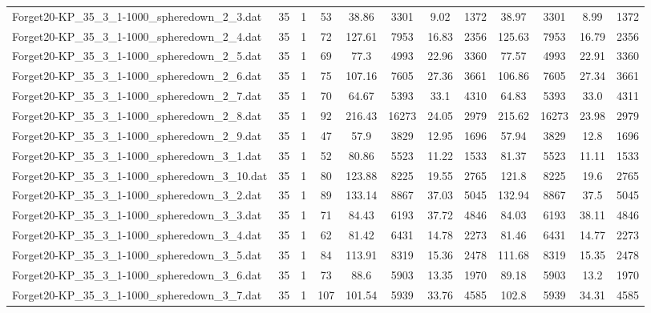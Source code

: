 \begin{sidewaystable}[!ht]
{\begin{tabular}{lccccccccccc}
Forget20-KP\_35\_3\_1-1000\_spheredown\_2\_3.dat & 35 & 1 & 53 & 38.86 & 3301 & 9.02 & 1372 & 38.97 & 3301 &  \textcolor{blue2}{8.99} & 1372 \\
Forget20-KP\_35\_3\_1-1000\_spheredown\_2\_4.dat & 35 & 1 & 72 & 127.61 & 7953 & 16.83 & 2356 & 125.63 & 7953 &  \textcolor{blue2}{16.79} & 2356 \\
Forget20-KP\_35\_3\_1-1000\_spheredown\_2\_5.dat & 35 & 1 & 69 & 77.3 & 4993 & 22.96 & 3360 & 77.57 & 4993 &  \textcolor{blue2}{22.91} & 3360 \\
Forget20-KP\_35\_3\_1-1000\_spheredown\_2\_6.dat & 35 & 1 & 75 & 107.16 & 7605 & 27.36 & 3661 & 106.86 & 7605 & 27.34 & 3661 \\
Forget20-KP\_35\_3\_1-1000\_spheredown\_2\_7.dat & 35 & 1 & 70 & 64.67 & 5393 & 33.1 & 4310 & 64.83 & 5393 &  \textcolor{blue2}{33.0} & 4311 \\
Forget20-KP\_35\_3\_1-1000\_spheredown\_2\_8.dat & 35 & 1 & 92 & 216.43 & 16273 & 24.05 & 2979 & 215.62 & 16273 &  \textcolor{blue2}{23.98} & 2979 \\
Forget20-KP\_35\_3\_1-1000\_spheredown\_2\_9.dat & 35 & 1 & 47 & 57.9 & 3829 & 12.95 & 1696 & 57.94 & 3829 &  \textcolor{blue2}{12.8} & 1696 \\
Forget20-KP\_35\_3\_1-1000\_spheredown\_3\_1.dat & 35 & 1 & 52 & 80.86 & 5523 & 11.22 & 1533 & 81.37 & 5523 &  \textcolor{blue2}{11.11} & 1533 \\
Forget20-KP\_35\_3\_1-1000\_spheredown\_3\_10.dat & 35 & 1 & 80 & 123.88 & 8225 &  \textcolor{blue2}{19.55} & 2765 & 121.8 & 8225 & 19.6 & 2765 \\
Forget20-KP\_35\_3\_1-1000\_spheredown\_3\_2.dat & 35 & 1 & 89 & 133.14 & 8867 &  \textcolor{blue2}{37.03} & 5045 & 132.94 & 8867 & 37.5 & 5045 \\
Forget20-KP\_35\_3\_1-1000\_spheredown\_3\_3.dat & 35 & 1 & 71 & 84.43 & 6193 &  \textcolor{blue2}{37.72} & 4846 & 84.03 & 6193 & 38.11 & 4846 \\
Forget20-KP\_35\_3\_1-1000\_spheredown\_3\_4.dat & 35 & 1 & 62 & 81.42 & 6431 & 14.78 & 2273 & 81.46 & 6431 &  \textcolor{blue2}{14.77} & 2273 \\
Forget20-KP\_35\_3\_1-1000\_spheredown\_3\_5.dat & 35 & 1 & 84 & 113.91 & 8319 & 15.36 & 2478 & 111.68 & 8319 &  \textcolor{blue2}{15.35} & 2478 \\
Forget20-KP\_35\_3\_1-1000\_spheredown\_3\_6.dat & 35 & 1 & 73 & 88.6 & 5903 & 13.35 & 1970 & 89.18 & 5903 &  \textcolor{blue2}{13.2} & 1970 \\
Forget20-KP\_35\_3\_1-1000\_spheredown\_3\_7.dat & 35 & 1 & 107 & 101.54 & 5939 &  \textcolor{blue2}{33.76} & 4585 & 102.8 & 5939 & 34.31 & 4585 \\

\end{tabular}}
\end{sidewaystable}
